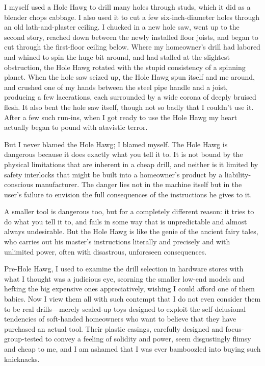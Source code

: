 \documentclass[
  fontsize=11pt,
  paper=landscape,
  twocolumn=true,
  pagesize=pdftex,
  headings=small,
  DIV=15,
  ]{scrartcl}
\begin{document}
I myself used a Hole Hawg to drill many holes through studs, which it
did as a blender chops cabbage. I also used it to cut a few
six-inch-diameter holes through an old lath-and-plaster ceiling. I
chucked in a new hole saw, went up to the second story, reached down
between the newly installed floor joists, and began to cut through the
first-floor ceiling below. Where my homeowner's drill had labored and
whined to spin the huge bit around, and had stalled at the slightest
obstruction, the Hole Hawg rotated with the stupid consistency of a
spinning planet. When the hole saw seized up, the Hole Hawg spun itself
and me around, and crushed one of my hands between the steel pipe handle
and a joist, producing a few lacerations, each surrounded by a wide
corona of deeply bruised flesh. It also bent the hole saw itself, though
not so badly that I couldn't use it. After a few such run-ins, when I
got ready to use the Hole Hawg my heart actually began to pound with
atavistic terror.

But I never blamed the Hole Hawg; I blamed myself. The Hole Hawg is
dangerous because it does exactly what you tell it to. It is not bound
by the physical limitations that are inherent in a cheap drill, and
neither is it limited by safety interlocks that might be built into a
homeowner's product by a liability-conscious manufacturer. The danger
lies not in the machine itself but in the user's failure to envision the
full consequences of the instructions he gives to it.

A smaller tool is dangerous too, but for a completely different reason:
it tries to do what you tell it to, and fails in some way that is
unpredictable and almost always undesirable. But the Hole Hawg is like
the genie of the ancient fairy tales, who carries out his master's
instructions literally and precisely and with unlimited power, often
with disastrous, unforeseen consequences.

Pre-Hole Hawg, I used to examine the drill selection in hardware stores
with what I thought was a judicious eye, scorning the smaller low-end
models and hefting the big expensive ones appreciatively, wishing I
could afford one of them babies. Now I view them all with such contempt
that I do not even consider them to be real drills---merely scaled-up
toys designed to exploit the self-delusional tendencies of soft-handed
homeowners who want to believe that they have purchased an actual tool.
Their plastic casings, carefully designed and focus-group-tested to
convey a feeling of solidity and power, seem disgustingly flimsy and
cheap to me, and I am ashamed that I was ever bamboozled into buying
such knicknacks.
\end{document}

